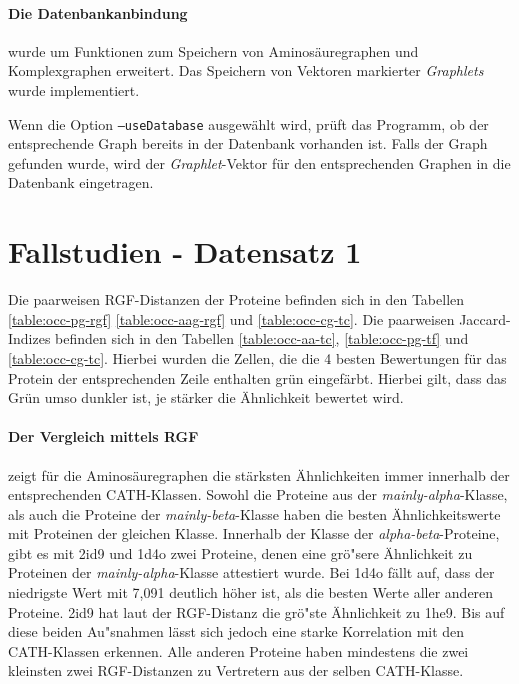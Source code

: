 \documentclass{report}
\begin{document}
 

\paragraph{Die Datenbankanbindung} wurde um Funktionen zum Speichern von Aminos\"auregraphen und Komplexgraphen erweitert. Das Speichern von Vektoren markierter \textit{Graphlets} wurde implementiert.

Wenn die Option \texttt{--useDatabase} ausgew\"ahlt wird, pr\"uft das Programm, ob der entsprechende Graph bereits in der Datenbank vorhanden ist. Falls der Graph gefunden wurde, wird der \textit{Graphlet}-Vektor f\"ur den entsprechenden Graphen in die Datenbank eingetragen. 



\section{Fallstudien - Datensatz 1}

Die paarweisen RGF-Distanzen der Proteine befinden sich in den Tabellen \ref{table:occ-pg-rgf} \ref{table:occ-aag-rgf} und \ref{table:occ-cg-tc}. Die paarweisen Jaccard-Indizes befinden sich in den Tabellen \ref{table:occ-aa-tc}, \ref{table:occ-pg-tf} und \ref{table:occ-cg-tc}.
Hierbei wurden die Zellen, die die 4 besten Bewertungen f\"ur das Protein der entsprechenden Zeile enthalten gr\"un eingef\"arbt. Hierbei gilt, dass das Gr\"un umso dunkler ist, je st\"arker die \"Ahnlichkeit bewertet wird.

\paragraph{Der Vergleich mittels RGF}
zeigt f\"ur die Aminos\"auregraphen die st\"arksten \"Ahnlichkeiten immer innerhalb der entsprechenden CATH-Klassen. Sowohl die Proteine aus der \textit{mainly-alpha}-Klasse, als auch die Proteine der \textit{mainly-beta}-Klasse haben die besten \"Ahnlichkeitswerte mit Proteinen der gleichen Klasse.
Innerhalb der Klasse der \textit{alpha-beta}-Proteine, gibt es mit 2id9 und 1d4o zwei Proteine, denen eine gr\"o"sere \"Ahnlichkeit zu Proteinen der \textit{mainly-alpha}-Klasse attestiert wurde.
Bei 1d4o f\"allt auf, dass der niedrigste Wert mit 7,091 deutlich h\"oher ist, als die besten Werte aller anderen Proteine.
2id9 hat laut der RGF-Distanz die gr\"o"ste \"Ahnlichkeit zu 1he9.
Bis auf diese beiden Au"snahmen l\"asst sich jedoch eine starke Korrelation mit den CATH-Klassen erkennen.
Alle anderen Proteine haben mindestens die zwei kleinsten zwei RGF-Distanzen zu Vertretern aus der selben CATH-Klasse.
\end{document}
